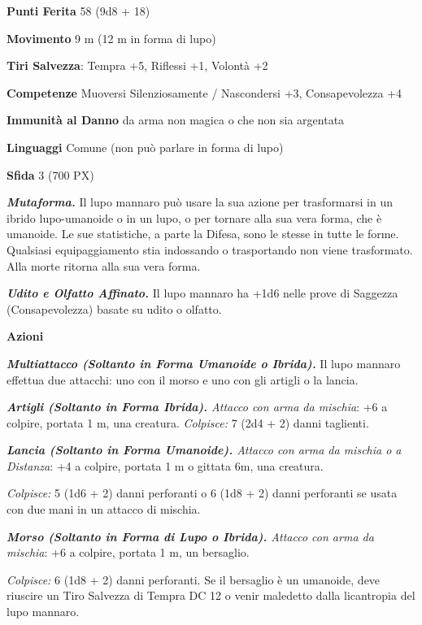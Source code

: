 \begin{multicols}{2}
\textbf{Punti Ferita} 58 (9d8 + 18)

\textbf{Movimento} 9 m (12 m in forma di lupo)

\textbf{Tiri Salvezza}: Tempra +5, Riflessi +1, Volontà +2

\textbf{Competenze} Muoversi Silenziosamente / Nascondersi +3, Consapevolezza +4

\textbf{Immunità al Danno} da arma non magica o che non sia argentata

\textbf{Linguaggi} Comune (non può parlare in forma di lupo)

\textbf{Sfida} 3 (700 PX)

\textit{\textbf{Mutaforma.}} Il lupo mannaro può usare la sua azione per trasformarsi in un ibrido lupo-umanoide o in un lupo, o per tornare alla sua vera forma, che è umanoide. Le sue statistiche, a parte la Difesa, sono le stesse in tutte le forme. Qualsiasi equipaggiamento stia indossando o trasportando non viene trasformato. Alla morte ritorna alla sua vera forma.

\textit{\textbf{Udito e Olfatto Affinato.}} Il lupo mannaro ha +1d6 nelle prove di Saggezza (Consapevolezza) basate su udito o olfatto.

\textbf{Azioni}

\textit{\textbf{Multiattacco (Soltanto in Forma Umanoide o Ibrida).}} Il lupo mannaro effettua due attacchi: uno con il morso e uno con gli artigli o la lancia.

\textit{\textbf{Artigli (Soltanto in Forma Ibrida).} Attacco con arma da mischia}: +6 a colpire, portata 1 m, una creatura. \textit{Colpisce:} 7 (2d4 + 2) danni taglienti.

\textit{\textbf{Lancia (Soltanto in Forma Umanoide).} Attacco con arma da mischia o a Distanza}: +4 a colpire, portata 1 m o gittata 6m, una creatura.

\textit{Colpisce:} 5 (1d6 + 2) danni perforanti o 6 (1d8 + 2) danni perforanti se usata con due mani in un attacco di mischia.

\textit{\textbf{Morso (Soltanto in Forma di Lupo o Ibrida).} Attacco con arma da mischia}: +6 a colpire, portata 1 m, un bersaglio.

\textit{Colpisce:} 6 (1d8 + 2) danni perforanti. Se il bersaglio è un umanoide, deve riuscire un Tiro Salvezza di Tempra DC 12 o venir maledetto dalla licantropia del lupo mannaro.


\end{multicols}

